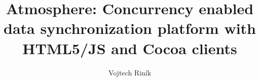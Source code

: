 \documentclass[]{tukethesis}
\author{Vojtech Riník}
\title{Atmosphere: Concurrency enabled data synchronization platform with HTML5/JS and Cocoa clients}
\subtitle{}
\begin{document}
\renewcommand\theHfigure{\theHsection.\arabic{figure}}
\renewcommand\theHtable{\theHsection.\arabic{table}}

\firstpage

\titlepage


% 
% 

\abstrakte %
\abstrakt %
\endabstract %

\end{document}
